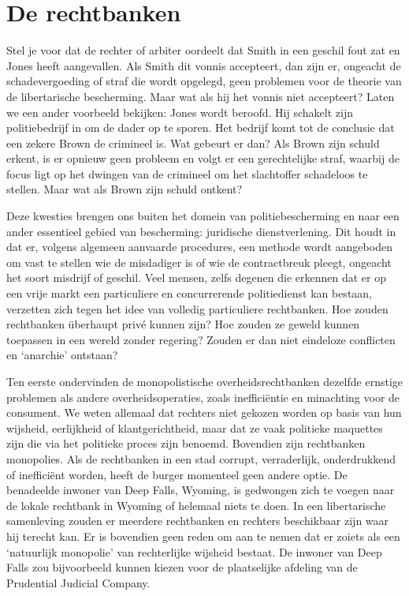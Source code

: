 \documentclass[
  a5paper,
  smalldemyvopaper,10pt,twoside,onecolumn,openright,extrafontsizes,hidelinks]{memoir}
\begin{document}
\section{De rechtbanken}\label{de-rechtbanken-1}

Stel je voor dat de rechter of arbiter oordeelt dat Smith in een geschil
fout zat en Jones heeft aangevallen. Als Smith dit vonnis accepteert,
dan zijn er, ongeacht de schadevergoeding of straf die wordt opgelegd,
geen problemen voor de theorie van de libertarische bescherming. Maar
wat als hij het vonnis niet accepteert? Laten we een ander voorbeeld
bekijken: Jones wordt beroofd. Hij schakelt zijn politiebedrijf in om de
dader op te sporen. Het bedrijf komt tot de conclusie dat een zekere
Brown de crimineel is. Wat gebeurt er dan? Als Brown zijn schuld erkent,
is er opnieuw geen probleem en volgt er een gerechtelijke straf, waarbij
de focus ligt op het dwingen van de crimineel om het slachtoffer
schadeloos te stellen. Maar wat als Brown zijn schuld ontkent?

Deze kwesties brengen ons buiten het domein van politiebescherming en
naar een ander essentieel gebied van bescherming: juridische
dienstverlening. Dit houdt in dat er, volgens algemeen aanvaarde
procedures, een methode wordt aangeboden om vast te stellen wie de
misdadiger is of wie de contractbreuk pleegt, ongeacht het soort
misdrijf of geschil. Veel mensen, zelfs degenen die erkennen dat er op
een vrije markt een particuliere en concurrerende politiedienst kan
bestaan, verzetten zich tegen het idee van volledig particuliere
rechtbanken. Hoe zouden rechtbanken überhaupt privé kunnen zijn? Hoe
zouden ze geweld kunnen toepassen in een wereld zonder regering? Zouden
er dan niet eindeloze conflicten en `anarchie' ontstaan?

Ten eerste ondervinden de monopolistische overheidsrechtbanken dezelfde
ernstige problemen als andere overheidsoperaties, zoals inefficiëntie en
minachting voor de consument. We weten allemaal dat rechters niet
gekozen worden op basis van hun wijsheid, eerlijkheid of
klantgerichtheid, maar dat ze vaak politieke maquettes zijn die via het
politieke proces zijn benoemd. Bovendien zijn rechtbanken monopolies.
Als de rechtbanken in een stad corrupt, verraderlijk, onderdrukkend of
inefficiënt worden, heeft de burger momenteel geen andere optie. De
benadeelde inwoner van Deep Falls, Wyoming, is gedwongen zich te voegen
naar de lokale rechtbank in Wyoming of helemaal niets te doen. In een
libertarische samenleving zouden er meerdere rechtbanken en rechters
beschikbaar zijn waar hij terecht kan. Er is bovendien geen reden om aan
te nemen dat er zoiets als een `natuurlijk monopolie' van rechterlijke
wijsheid bestaat. De inwoner van Deep Falls zou bijvoorbeeld kunnen
kiezen voor de plaatselijke afdeling van de Prudential Judicial Company.
\end{document}
